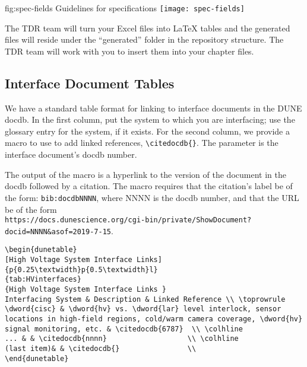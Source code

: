\begin{dunefigure}{fig:spec-fields}
       {Guidelines for specifications}
    \texttt{[image: spec-fields]}
    \end{dunefigure}
The TDR team will turn your Excel files into LaTeX tables and the generated files will reside under the ``generated'' folder in the repository structure. The TDR team will work with you to insert them into your chapter files.

\subsection{Interface Document Tables}
\label{sec:tables-intfc}

We have a standard table format for linking to interface documents in the DUNE docdb. In the first column, put the system to which you are interfacing; use the glossary entry for the system, if it exists. For the second column, we provide a macro to use to add linked references,  \verb|\citedocdb{}|. The parameter is the interface document's docdb number. 

The output of the macro is a hyperlink to the version of the document in the docdb followed by a citation.  The macro requires that the citation's label be of the form: \verb|bib:docdbNNNN|, where NNNN is the docdb number, and that the URL be of the form \\ \verb|https://docs.dunescience.org/cgi-bin/private/ShowDocument?docid=NNNN&asof=2019-7-15|.



\begin{verbatim}
\begin{dunetable}
[High Voltage System Interface Links]
{p{0.25\textwidth}p{0.5\textwidth}l}
{tab:HVinterfaces}
{High Voltage System Interface Links }   
Interfacing System & Description & Linked Reference \\ \toprowrule
\dword{cisc} & \dword{hv} vs. \dword{lar} level interlock, sensor locations in high-field regions, cold/warm camera coverage, \dword{hv} signal monitoring, etc. & \citedocdb{6787}  \\ \colhline
... & & \citedocdb{nnnn}                   \\ \colhline
(last item)& & \citedocdb{}                \\
\end{dunetable}
\end{verbatim}


